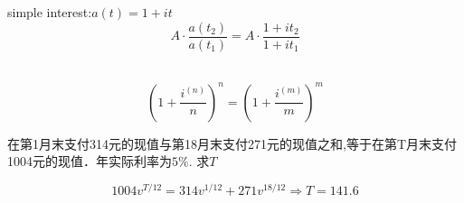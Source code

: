 \begin{example}
simple interest:$a(t)=1+it$\\
$$A \cdot \frac{a\left(t_{2}\right)}{a\left(t_{1}\right)}=A \cdot \frac{1+i t_{2}}{1+i t_{1}}$$
\end{example}
\
$$(1+\frac{i^{(n)}}{n})^{n}=(1+\frac{i^{(m)}}{m})^{m}$$
\begin{exercise}
	在第1月末支付314元的现值与第18月末支付271元的现值之和,等于在第T月末支付1004元的现值．年实际利率为$5\%$. 求$T$
\end{exercise}
\begin{solution}
$$1004 v^{T / 12}=314 v^{1 / 12}+271 v^{18 / 12} \Rightarrow T=141.6$$
\end{solution}